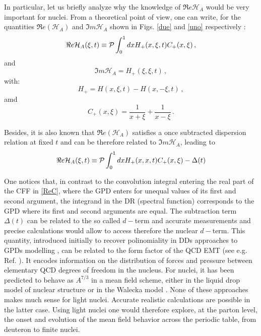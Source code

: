 \documentclass[times, twoside]{PosWhiPap}
\begin{document}
In particular, let us briefly 
analyze why the knowledge of $\Re e\mathcal{H}_{A}$ would be very
important for nuclei.
From a theoretical point of view, one can write,
for the quantities $\Re e(\mathcal{H}_{A})$ 
and $\Im m \mathcal{H}_{A}$
shown in Figs.
\ref{due} and \ref{uno} respectively \cite{Guidal:2013rya}:
\begin{equation}
\Re e \mathcal{H}_{A} (\xi,t) \equiv 
{\cal P} \int_0^1 dx H_+(x,\xi,t) C_+(x,\xi) \, ,
\label{ReC}
\end{equation}
and
\begin{equation}
  \Im m \mathcal{H}_{A} = H_+(\xi,\xi,t)  \, ,
\end{equation}
with:
\begin{equation}
    H_+ = H(x,\xi,t)-H(x,-\xi,t) \, ,
\end{equation}
amd
\begin{equation}
    C_+(x,\xi) = \frac{1}{x+\xi}+\frac{1}{x-\xi} \, .
\end{equation}


Besides, it is also known that $\Re e(\mathcal{H}_{A})$
satisfies a once subtracted dispersion relation at fixed $t$ and can be therefore related
to $\Im m \mathcal{H}_{A}$, leading to
\cite{Anikin:2007yh,Diehl:2007jb,
Radyushkin:2011dh,
Pasquini:2014vua}
\begin{equation}
\Re e \mathcal{H}_{A} (\xi,t) \equiv
{\cal P} \int_0^1 dx H_+(x,x,t) C_+(x,\xi)
- \Delta(t)
\label{disp}
\end{equation}

One notices that, in
contrast to the convolution integral entering the real part of the CFF in 
\eqref{ReC}, where
the GPD enters for unequal values of its first and second argument, the integrand in the
DR (spectral function) corresponds to the GPD where its first and second arguments
are equal.
The subtraction term $\Delta(t)$ can be related to the
so called $d-$term and
accurate measurements and precise calculations would allow to access therefore
the nuclear $d-$term.
This quantity, introduced initially to recover polinomiality
in DDs approaches to GPDs modelling \cite{Polyakov:1999gs},
can be related to the form factor of the QCD EMT
(see e.g. Ref. \cite{Polyakov:2018zvc}).
It encodes information on the distribution of forces and pressure between elementary QCD degrees of freedom
in the nucleus. For
nuclei, it has been predicted to behave as $A^{7/3}$ in a mean field scheme, either in the liquid drop model of nuclear structure \cite{Polyakov:2002yz}
or in the Walecka model \cite{Jung:2014jja}.
None of these approaches makes much sense for light nuclei.
Accurate realistic calculations are possible in the latter case.
Using light nuclei
one would therefore explore, at the parton level, the
onset and evolution of the mean field
behavior across the periodic table, from deuteron to finite nuclei.
\end{document}
